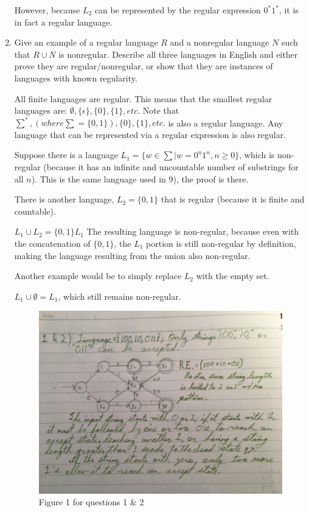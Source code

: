 \documentclass{article}
\begin{document}
\begin{enumerate}
  		However, because $L_2$ can be represented by the regular expression $0^*1^*$, it is in fact a regular language.
  		

\item Give an example of a regular language $R$ and a nonregular
  language $N$ such that $R\cup N$ is nonregular. Describe all three
  languages in English and either prove they are regular/nonregular,
  or show that they are instances of languages with known regularity.

  All finite languages are regular. This means that the smallest regular languages are:
  $\emptyset, \{\epsilon\}, \{0\}, \{1\}, etc.$
  Note that $\sum^*, (where \sum = \{0,1\}), \{0\}, \{1\}, etc.$ is also a regular language.
  Any language that can be represented via a regular expression is also regular.

  
  Suppose there is a language $L_1 = \{w \in \sum | w = 0^n1^n, n \geq 0\}$, which is non-regular (because it has an infinite and uncountable number of substrings for all $n$). This is the same language used in 9), the proof is there.
  
  There is another language, $L_2 = \{0, 1\}$ that is regular (because it is finite and countable).
  
  $L_1 \cup L_2 = \{0, 1\}L_1$ The resulting language is non-regular, because even with the concatenation of $\{0,1\}$, the $L_1$
  portion is still non-regular by definition, making the language resulting from the union also non-regular. 
  
  Another example would be to simply replace $L_2$ with the empty set. 
  
  $L_1 \cup \emptyset = L_1$, which still remains non-regular.
  
  
  \begin{figure}[b!]
  
  	\includegraphics[width=\linewidth]{Math041&2}
  	\caption{Figure 1 for questions 1 \& 2}


\end{figure}
\end{enumerate}
\end{document}
